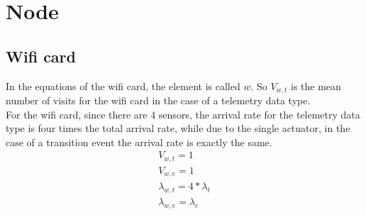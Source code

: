 \documentclass[11pt]{article}
\begin{document}
\section{Node}


%
%
%
%
%



\subsection{Wifi card}
In the equations of the wifi card, the element is called $w$. So $V_{w, t}$ is the mean number of visits for the wifi card in the case of a telemetry data type.\\
For the wifi card, since there are 4 sensors, the arrival rate for the telemetry data type is four times the total arrival rate, while due to the single actuator, in the case of a transition event the arrival rate is exactly the same.
\begin{equation}
    \begin{array}{l}
        V_{w, t} = 1 \\
        V_{w, e} = 1 \\
        \lambda_{w, t} = 4*\lambda_{t} \\ %
        \lambda_{w, e} = \lambda_{e} \\ %
    \end{array}
\end{equation}
\end{document}
